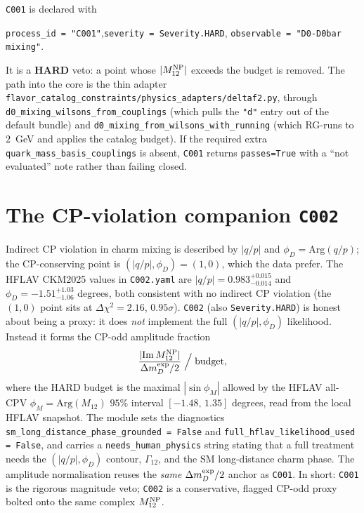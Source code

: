 \documentclass[11pt]{article}
\newcommand{\code}[1]{\texttt{#1}}
\newcommand{\Mtwelve}{M_{12}}
\newcommand{\dmD}{\Delta m_D}
\theoremstyle{definition}
\begin{document}
\code{C001} is declared with
\begin{center}
\code{process\_id = "C001"},\quad \code{severity = Severity.HARD},\quad
\code{observable = "D0-D0bar mixing"}.
\end{center}
It is a \textbf{HARD} veto: a point whose $|\Mtwelve^{\rm NP}|$ exceeds the
budget is removed. The path into the core is the thin adapter
\code{flavor\_catalog\_constraints/physics\_adapters/deltaf2.py}, through
\code{d0\_mixing\_wilsons\_from\_couplings} (which pulls the \code{"d"} entry out
of the default bundle) and \code{d0\_mixing\_from\_wilsons\_with\_running}
(which RG-runs to $2$~GeV and applies the catalog budget). If the required extra
\code{quark\_mass\_basis\_couplings} is absent, \code{C001} returns
\code{passes=True} with a ``not evaluated'' note rather than failing closed.

\section{The CP-violation companion \code{C002}}
\label{sec:c002}

Indirect CP violation in charm mixing is described by $|q/p|$ and
$\phi_D=\mathrm{Arg}(q/p)$; the CP-conserving point is $(|q/p|,\phi_D)=(1,0)$,
which the data prefer. The HFLAV CKM2025 values in \code{C002.yaml} are
$|q/p| = 0.983^{+0.015}_{-0.014}$ and
$\phi_D = -1.51^{+1.03}_{-1.06}$ degrees, both consistent with no
indirect CP violation (the $(1,0)$ point sits at $\Delta\chi^2=2.16$,
$0.95\sigma$). \code{C002} (also \code{Severity.HARD}) is honest about being a
proxy: it does \emph{not} implement the full $(|q/p|,\phi_D)$ likelihood. Instead
it forms the CP-odd amplitude fraction
\begin{equation}
\frac{|\mathrm{Im}\,\Mtwelve^{\rm NP}|}{\dmD^{\rm exp}/2}
\;\Big/\; \text{budget},
\label{eq:c002}
\end{equation}
where the HARD budget is the maximal $|\sin\phi_M|$ allowed by the HFLAV all-CPV
$\phi_M=\mathrm{Arg}(\Mtwelve)$ $95\%$ interval $[-1.48,\,1.35]$ degrees, read
from the local HFLAV snapshot. The module sets the diagnostics
\code{sm\_long\_distance\_phase\_grounded = False} and
\code{full\_hflav\_likelihood\_used = False}, and carries a
\code{needs\_human\_physics} string stating that a full treatment needs the
$(|q/p|,\phi_D)$ contour, $\Gamma_{12}$, and the SM long-distance charm phase.
The amplitude normalisation reuses the \emph{same} $\dmD^{\rm exp}/2$ anchor as
\code{C001}. In short: \code{C001} is the rigorous magnitude veto; \code{C002} is
a conservative, flagged CP-odd proxy bolted onto the same complex
$\Mtwelve^{\rm NP}$.
\end{document}
